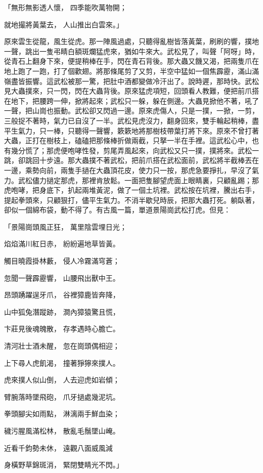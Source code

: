 \begin{showcontents}{}
「無形無影透人懷，  四季能吹萬物開；

就地撮將黃葉去，  人山推出白雲來。」

原來雲生從龍，風生從虎。那一陣風過處，只聽得亂樹皆落黃葉，刷刷的響，撲地一聲，跳出一隻弔睛白額斑爛猛虎來，猶如牛來大。武松見了，叫聲「阿呀」時，從青石上翻身下來，便提稍棒在手，閃在青石背後。那大蟲又饑又渴，把兩隻爪在地上跑了一跑，打了個歡翅。將那條尾剪了又剪，半空中猛如一個焦霹靂，滿山滿嶺盡皆振響。這武松被那一驚，把肚中酒都變做冷汗出了。說時遲，那時快。武松見大蟲撲來，只一閃，閃在大蟲背後。原來猛虎項短，回頭看人教難，便把前爪搭在地下，把腰跨一伸，掀將起來；武松只一躲，躲在側邊。大蟲見掀他不著，吼了一聲，把山崗也振動。武松卻又閃過一邊。原來虎傷人，只是一撲，一掀，一剪，三般捉不著時，氣力已自沒了一半。武松見虎沒力，翻身回來，雙手輪起稍棒，盡平生氣力，只一棒，只聽得一聲響，簌簌地將那樹枝帶葉打將下來。原來不曾打著大蟲，正打在樹枝上，磕磕把那條棒折做兩截，只拏一半在手裡。這武松心中，也有幾分慌了；那虎便咆哮性發，剪尾弄風起來，向武松又只一撲，撲將來。武松一跳，卻跳回十步遠。那大蟲撲不著武松，把前爪搭在武松面前，武松將半截棒丟在一邊，乘勢向前，兩隻手撾在大蟲頂花皮，使力只一按，那虎急要掙扎，早沒了氣力。武松儘力撾定那虎，那裡肯放鬆。一面把隻腳望虎面上眼睛裏，只顧亂踢；那虎咆哮，把身底下，扒起兩堆黃泥，做了一個土坑裡。武松按在坑裡，騰出右手，提起拳頭來，只顧狠打，儘平生氣力。不消半歇兒時辰，把那大蟲打死。躺臥著，卻似一個綿布袋，動不得了。有古風一篇，單道景陽崗武松打虎。但見：

「景陽崗頭風正狂，  萬里陰雲埋日光；

焰焰滿川紅日赤，  紛紛遍地草皆黃。

觸目曉霞掛林藪，  侵人冷霧滿穹蒼；

忽聞一聲霹靂響，  山腰飛出獸中王。

昂頭踴躍逞牙爪，  谷裡獐鹿皆奔降，

山中狐兔潛蹤跡，  澗內獐猿驚且慌，

卞莊見後魂魄散，  存孝遇時心膽亡。

清河壯士酒未醒，  忽在崗頭偶相迎；

上下尋人虎飢渴，  撞著猙獰來撲人。

虎來撲人似山倒，  人去迎虎如岩傾；

臂腕落時墜飛砲，  爪牙撾處幾泥坑。

拳頭腳尖如雨點，  淋漓兩手鮮血染；

穢污腥風滿松林，  散亂毛鬚墜山崦。

近看千鈞勢未休，  遠觀八面威風減

身橫野草錦斑消，  緊閉雙睛光不閃。」


\end{showcontents}
